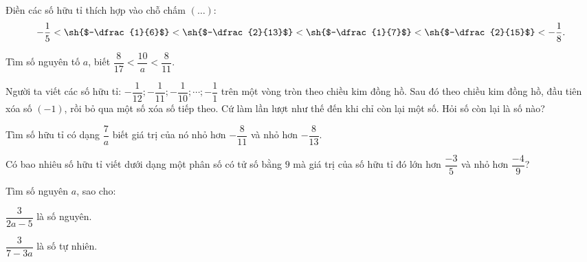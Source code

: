 \begin{bt}%
	Điền các số hữu tỉ thích hợp vào chỗ chấm $(\ldots)$:
	$$-\dfrac{1}{5}<\sh{$-\dfrac{1}{6}$}<\sh{$-\dfrac{2}{13}$}<\sh{$-\dfrac{1}{7}$}<\sh{$-\dfrac{2}{15}$}<-\dfrac{1}{8}.$$
\end{bt}

\begin{bt}%
	Tìm số nguyên tố $a$, biết $\dfrac{8}{17}<\dfrac{10}{a}<\dfrac{8}{11}$.
\end{bt}
\begin{bt}%
	Người ta viết các số hữu tỉ: $-\dfrac{1}{12};-\dfrac{1}{11};-\dfrac{1}{10}; \cdots;-\dfrac{1}{1}$ trên một vòng tròn theo chiều kim đồng hồ. Sau đó theo chiều kim đồng hồ, đầu tiên xóa số $(-1)$, rồi bỏ qua một số xóa số tiếp theo. Cứ làm lần lượt như thế đến khi chỉ còn lại một số. Hỏi số còn lại là số nào?
\end{bt}
\begin{bt}%
	Tìm số hữu tỉ có dạng $\dfrac{7}{a}$ biết giá trị của nó nhỏ hơn $-\dfrac{8}{11}$ và nhỏ hơn $-\dfrac{8}{13}$.
\end{bt}
\begin{bt}%
	Có bao nhiêu số hữu tỉ viết dưới dạng một phân số có tử số bằng $9$ mà giá trị của số hữu tỉ đó lớn hơn $\dfrac{-3}{5}$ và nhỏ hơn $\dfrac{-4}{9}$?
\end{bt}
\begin{bt}%
	Tìm số nguyên $a$, sao cho:
	\begin{listEX}
		\item $\dfrac{3}{2a-5}$ là số nguyên.
		\item $\dfrac{3}{7-3a}$ là số tự nhiên.
	\end{listEX}
\end{bt}
